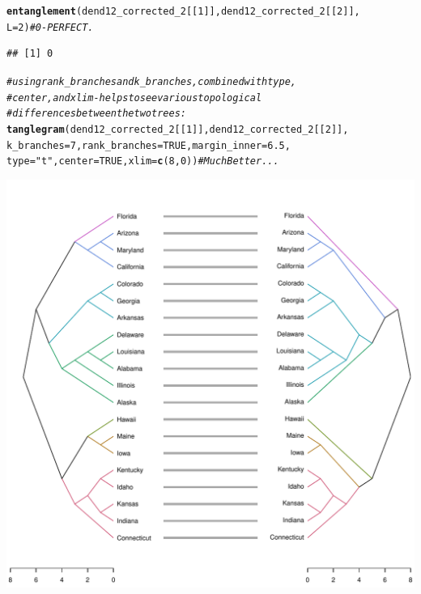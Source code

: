 \documentclass[shortnames,nojss,article]{jss}\usepackage[]{graphicx}\usepackage[]{color}
\makeatletter
\def\maxwidth{ %
  \ifdim\Gin@nat@width>\linewidth
    \linewidth
  \else
    \Gin@nat@width
  \fi
}
\newcommand{\hlnum}[1]{\textcolor[rgb]{0.686,0.059,0.569}{#1}}%
\newcommand{\hlstr}[1]{\textcolor[rgb]{0.192,0.494,0.8}{#1}}%
\newcommand{\hlcom}[1]{\textcolor[rgb]{0.678,0.584,0.686}{\textit{#1}}}%
\newcommand{\hlstd}[1]{\textcolor[rgb]{0.345,0.345,0.345}{#1}}%
\newcommand{\hlkwc}[1]{\textcolor[rgb]{0.333,0.667,0.333}{#1}}%
\newcommand{\hlkwd}[1]{\textcolor[rgb]{0.737,0.353,0.396}{\textbf{#1}}}%
\newenvironment{kframe}{%
 \def\at@end@of@kframe{}%
 \ifinner\ifhmode%
  \def\at@end@of@kframe{\end{minipage}}%
  \begin{minipage}{\columnwidth}%
 \fi\fi%
 \def\FrameCommand##1{\hskip\@totalleftmargin \hskip-\fboxsep
 \colorbox{shadecolor}{##1}\hskip-\fboxsep
     \hskip-\linewidth \hskip-\@totalleftmargin \hskip\columnwidth}%
 \MakeFramed {\advance\hsize-\width
   \@totalleftmargin\z@ \linewidth\hsize
   \@setminipage}}%
 {\par\unskip\endMakeFramed%
 \at@end@of@kframe}
\newenvironment{knitrout}{}{} %
\makeatother
\begin{document}
\begin{knitrout}
{}


\begin{kframe}\begin{alltt}
\hlkwd{entanglement}\hlstd{(dend12_corrected_2[[}\hlnum{1}\hlstd{]], dend12_corrected_2[[}\hlnum{2}\hlstd{]],}
    \hlkwc{L} \hlstd{=} \hlnum{2}\hlstd{)}  \hlcom{# 0 - PERFECT.}
\end{alltt}
\begin{verbatim}
## [1] 0
\end{verbatim}
\begin{alltt}
\hlcom{# using rank_branches and k_branches, combined with type,}
\hlcom{# center, and xlim - helps to see various topological}
\hlcom{# differences between the two trees:}
\hlkwd{tanglegram}\hlstd{(dend12_corrected_2[[}\hlnum{1}\hlstd{]], dend12_corrected_2[[}\hlnum{2}\hlstd{]],}
    \hlkwc{k_branches} \hlstd{=} \hlnum{7}\hlstd{,} \hlkwc{rank_branches} \hlstd{=} \hlnum{TRUE}\hlstd{,} \hlkwc{margin_inner} \hlstd{=} \hlnum{6.5}\hlstd{,}
    \hlkwc{type} \hlstd{=} \hlstr{"t"}\hlstd{,} \hlkwc{center} \hlstd{=} \hlnum{TRUE}\hlstd{,} \hlkwc{xlim} \hlstd{=} \hlkwd{c}\hlstd{(}\hlnum{8}\hlstd{,} \hlnum{0}\hlstd{))}  \hlcom{# Much Better...}
\end{alltt}
\end{kframe}

{\centering \includegraphics[width=\maxwidth]{figure/untangle_step_rotate_2side_example5} 

}
\end{knitrout}
\end{document}
